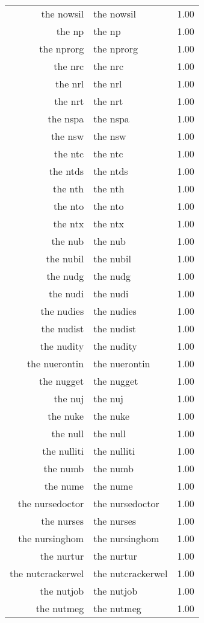 \begin{table}[ht]
\begin{tabular}{rlr}
  the nowsil & the nowsil & 1.00 \\ 
  the np & the np & 1.00 \\ 
  the nprorg & the nprorg & 1.00 \\ 
  the nrc & the nrc & 1.00 \\ 
  the nrl & the nrl & 1.00 \\ 
  the nrt & the nrt & 1.00 \\ 
  the nspa & the nspa & 1.00 \\ 
  the nsw & the nsw & 1.00 \\ 
  the ntc & the ntc & 1.00 \\ 
  the ntds & the ntds & 1.00 \\ 
  the nth & the nth & 1.00 \\ 
  the nto & the nto & 1.00 \\ 
  the ntx & the ntx & 1.00 \\ 
  the nub & the nub & 1.00 \\ 
  the nubil & the nubil & 1.00 \\ 
  the nudg & the nudg & 1.00 \\ 
  the nudi & the nudi & 1.00 \\ 
  the nudies & the nudies & 1.00 \\ 
  the nudist & the nudist & 1.00 \\ 
  the nudity & the nudity & 1.00 \\ 
  the nuerontin & the nuerontin & 1.00 \\ 
  the nugget & the nugget & 1.00 \\ 
  the nuj & the nuj & 1.00 \\ 
  the nuke & the nuke & 1.00 \\ 
  the null & the null & 1.00 \\ 
  the nulliti & the nulliti & 1.00 \\ 
  the numb & the numb & 1.00 \\ 
  the nume & the nume & 1.00 \\ 
  the nursedoctor & the nursedoctor & 1.00 \\ 
  the nurses & the nurses & 1.00 \\ 
  the nursinghom & the nursinghom & 1.00 \\ 
  the nurtur & the nurtur & 1.00 \\ 
  the nutcrackerwel & the nutcrackerwel & 1.00 \\ 
  the nutjob & the nutjob & 1.00 \\ 
  the nutmeg & the nutmeg & 1.00 \\ 

\end{tabular}
\end{table}
